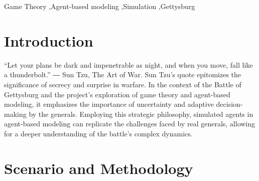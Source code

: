 \documentclass[final,5p,times,twocolumn,authoryear]{elsarticle}
\begin{document}
\begin{frontmatter}

\begin{keyword}
Game Theory \sep Agent-based modeling \sep Simulation \sep Gettysburg



\end{keyword}


\end{frontmatter}




\section{Introduction}
\label{introduction}

“Let your plans be dark and impenetrable as night, and when you move, fall like a thunderbolt.”
― Sun Tzu, The Art of War. Sun Tzu's quote epitomizes the significance of secrecy and surprise in warfare. In the context of the Battle of Gettysburg and the project's exploration of game theory and agent-based modeling, it emphasizes the importance of uncertainty and adaptive decision-making by the generals. Employing this strategic philosophy, simulated agents in agent-based modeling can replicate the challenges faced by real generals, allowing for a deeper understanding of the battle's complex dynamics.

\section{Scenario and Methodology}
\end{document}

